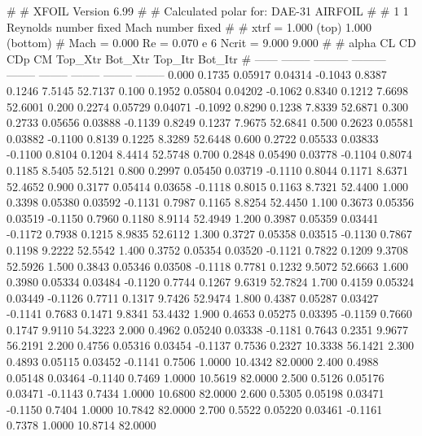 #  
#       XFOIL         Version 6.99
#  
# Calculated polar for: DAE-31 AIRFOIL                                  
#  
# 1 1 Reynolds number fixed          Mach number fixed         
#  
# xtrf =   1.000 (top)        1.000 (bottom)  
# Mach =   0.000     Re =     0.070 e 6     Ncrit =   9.000  9.000
#  
#   alpha    CL        CD       CDp       CM     Top_Xtr  Bot_Xtr  Top_Itr  Bot_Itr
#  ------ -------- --------- --------- -------- -------- -------- -------- --------
   0.000   0.1735   0.05917   0.04314  -0.1043   0.8387   0.1246   7.5145  52.7137
   0.100   0.1952   0.05804   0.04202  -0.1062   0.8340   0.1212   7.6698  52.6001
   0.200   0.2274   0.05729   0.04071  -0.1092   0.8290   0.1238   7.8339  52.6871
   0.300   0.2733   0.05656   0.03888  -0.1139   0.8249   0.1237   7.9675  52.6841
   0.500   0.2623   0.05581   0.03882  -0.1100   0.8139   0.1225   8.3289  52.6448
   0.600   0.2722   0.05533   0.03833  -0.1100   0.8104   0.1204   8.4414  52.5748
   0.700   0.2848   0.05490   0.03778  -0.1104   0.8074   0.1185   8.5405  52.5121
   0.800   0.2997   0.05450   0.03719  -0.1110   0.8044   0.1171   8.6371  52.4652
   0.900   0.3177   0.05414   0.03658  -0.1118   0.8015   0.1163   8.7321  52.4400
   1.000   0.3398   0.05380   0.03592  -0.1131   0.7987   0.1165   8.8254  52.4450
   1.100   0.3673   0.05356   0.03519  -0.1150   0.7960   0.1180   8.9114  52.4949
   1.200   0.3987   0.05359   0.03441  -0.1172   0.7938   0.1215   8.9835  52.6112
   1.300   0.3727   0.05358   0.03515  -0.1130   0.7867   0.1198   9.2222  52.5542
   1.400   0.3752   0.05354   0.03520  -0.1121   0.7822   0.1209   9.3708  52.5926
   1.500   0.3843   0.05346   0.03508  -0.1118   0.7781   0.1232   9.5072  52.6663
   1.600   0.3980   0.05334   0.03484  -0.1120   0.7744   0.1267   9.6319  52.7824
   1.700   0.4159   0.05324   0.03449  -0.1126   0.7711   0.1317   9.7426  52.9474
   1.800   0.4387   0.05287   0.03427  -0.1141   0.7683   0.1471   9.8341  53.4432
   1.900   0.4653   0.05275   0.03395  -0.1159   0.7660   0.1747   9.9110  54.3223
   2.000   0.4962   0.05240   0.03338  -0.1181   0.7643   0.2351   9.9677  56.2191
   2.200   0.4756   0.05316   0.03454  -0.1137   0.7536   0.2327  10.3338  56.1421
   2.300   0.4893   0.05115   0.03452  -0.1141   0.7506   1.0000  10.4342  82.0000
   2.400   0.4988   0.05148   0.03464  -0.1140   0.7469   1.0000  10.5619  82.0000
   2.500   0.5126   0.05176   0.03471  -0.1143   0.7434   1.0000  10.6800  82.0000
   2.600   0.5305   0.05198   0.03471  -0.1150   0.7404   1.0000  10.7842  82.0000
   2.700   0.5522   0.05220   0.03461  -0.1161   0.7378   1.0000  10.8714  82.0000
